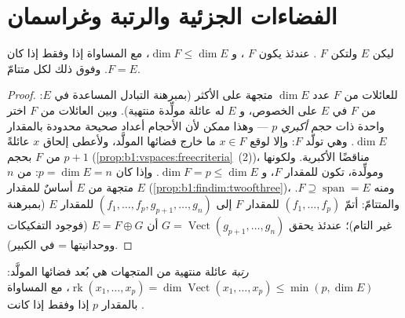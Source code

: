 \section{الفضاءات الجزئية والرتبة وغراسمان}

\begin{theorem}\label{thm:b1:findim:subspaces}
ليكن $E$  ولتكن $F$ . عندئذ يكون $F$
، و $\dim F \leq \dim E$، مع المساواة إذا وفقط
إذا كان $F = E$. وفوق ذلك لكل   متتامّ.
\end{theorem}

\begin{proof}
للعائلات  من $F$ عدد $\dim E$ متجهة على الأكثر (بمبرهنة التبادل المساعدة
في $E$:  من $F$  في $E$ على الخصوص، و $E$
له عائلة مولِّدة منتهية). وبين العائلات  من $F$
اختر واحدة ذات حجم \emph{أكبري} $p$ --- وهذا ممكن لأن الأحجام
أعداد صحيحة محدودة بالمقدار $\dim E$. وهي تولّد $F$: وإلا لوقع
$x \in F$ ما خارج فضائها المولَّد، ولأعطى إلحاق $x$
عائلةً  من $F$ بحجم $p + 1$
(\cref{prop:b1:vspaces:freecriteria}~(2))، مناقضًا
الأكبرية. ولكونها  ومولِّدة، تكون  للمقدار $F$، و
$\dim F = p \leq \dim E$. وإذا كان $p = \dim E = n$:  من $n$ متجهة من
$E$ أساسٌ للمقدار $E$ (\cref{prop:b1:findim:twoofthree})، ومنه $F
\supseteq \operatorname{span} = E$. والمتتامّ: أتمّ 
$(f_1, \dots, f_p)$ للمقدار $F$ إلى  $(f_1, \dots, f_p, g_{p+1},
\dots, g_n)$ للمقدار $E$ (بمبرهنة  غير التام)؛ عندئذ يحقق $G =
\operatorname{Vect}(g_{p+1}, \dots, g_n)$ أن $E = F \oplus G$
(فوجود التفكيكات ووحدانيتها =  في
 الكبير).
\end{proof}

\begin{definition}\label{def:b1:findim:rank}
\emph{رتبة} عائلة منتهية من
المتجهات هي بُعد فضائها المولَّد:
$\operatorname{rk}(x_1, \dots, x_p) = \dim
\operatorname{Vect}(x_1, \dots, x_p) \leq \min(p, \dim E)$،
مع المساواة بالمقدار $p$ إذا وفقط إذا كانت .
\end{definition}

